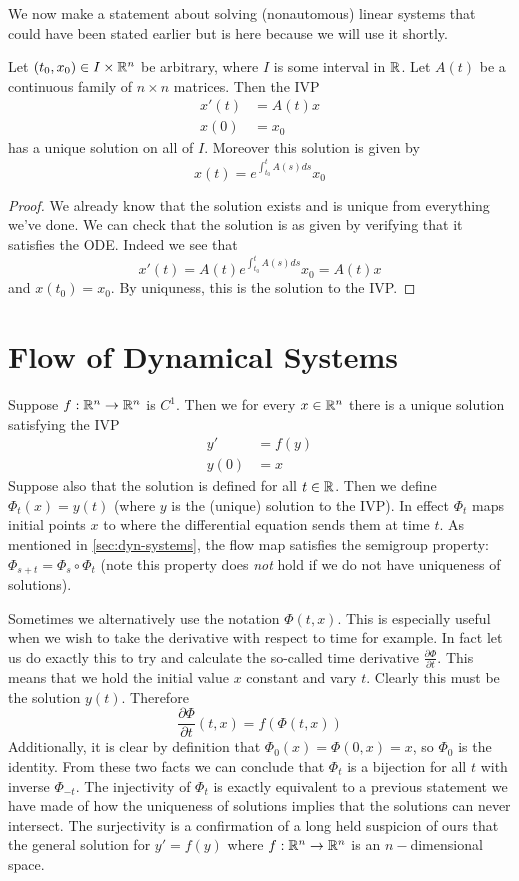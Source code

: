 We now make a statement about solving (nonautomous) linear systems that could have been stated earlier but is here because we will use it shortly.
\begin{corollary}\label{cor:cont-mat-exist}
Let $(t_0, x_0) \in I \times \mathbb{R}^n$ be arbitrary, where $I$ is some interval in $\mathbb{R}$. Let $A(t)$ be a continuous family of $n \times n$ matrices. Then the IVP
\begin{align*}
    x'(t) &= A(t)x\\
    x(0) &= x_0
\end{align*}
has a unique solution on all of $I$. Moreover this solution is given by
$$ x(t) = e^{\int_{t_0}^t A(s) ds} x_0 $$
\end{corollary}
\begin{proof}
    We already know that the solution exists and is unique from everything we've done. We can check that the solution is as given by verifying that it satisfies the ODE. Indeed we see that
    $$ x'(t) = A(t) e^{\int_{t_0}^t A(s) ds} x_0 = A(t) x $$
    and $x(t_0) = x_0$. By uniquness, this is the solution to the IVP.
\end{proof}

\section{Flow of Dynamical Systems}
Suppose $f: \mathbb{R}^n \to \mathbb{R}^n$ is $C^1$. Then we for every $x \in \mathbb{R}^n$ there is a unique solution satisfying the IVP
\begin{align*}
    y' &= f(y)\\
    y(0) &= x
\end{align*}
Suppose also that the solution is defined for all $t \in \mathbb{R}$.
Then we define $\Phi_t(x) = y(t)$ (where $y$ is the (unique) solution to the IVP). In effect $\Phi_t$ maps initial points $x$ to where the differential equation sends them at time $t$. As mentioned in \autoref{sec:dyn-systems}, the flow map satisfies the semigroup property: $\Phi_{s + t} = \Phi_s \circ \Phi_t$ (note this property does \textit{not} hold if we do not have uniqueness of solutions).

Sometimes we alternatively use the notation $\Phi(t, x)$. This is especially useful when we wish to take the derivative with respect to time for example. In fact let us do exactly this to try and calculate the so-called time derivative $\frac{\partial \Phi}{\partial t}$. This means that we hold the initial value $x$ constant and vary $t$. Clearly this must be the solution $y(t)$. Therefore
$$ \frac{\partial \Phi}{\partial t} (t, x) =  f(\Phi(t, x)) $$
Additionally, it is clear by definition that $\Phi_0(x) = \Phi(0, x) = x$, so $\Phi_0$ is the identity. From these two facts we can conclude that $\Phi_t$ is a bijection for all $t$ with inverse $\Phi_{-t}$. The injectivity of $\Phi_t$ is exactly equivalent to a previous statement we have made of how the uniqueness of solutions implies that the solutions can never intersect. The surjectivity is a confirmation of a long held suspicion of ours that the general solution for $y' = f(y)$ where $f: \mathbb{R}^n \to \mathbb{R}^n$ is an $n-$dimensional space.

